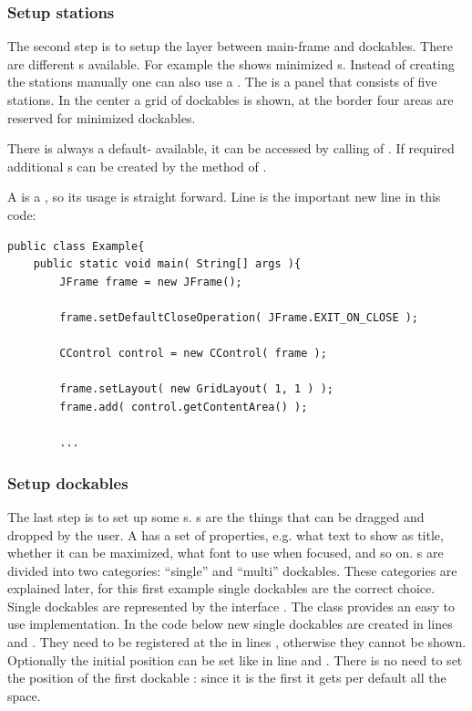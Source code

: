 \subsubsection{Setup stations}
The second step is to setup the layer between main-frame and dockables. There are different s available. For example the  shows minimized s. Instead of creating the stations manually one can also use a . The  is a panel that consists of five stations. In the center a grid of dockables is shown, at the border four areas are reserved for minimized dockables.

There is always a default- available, it can be accessed by calling  of . If required additional s can be created by the method  of .

A  is a , so its usage is straight forward. Line  is the important new line in this code:
\begin{lstlisting}
public class Example{
	public static void main( String[] args ){
		JFrame frame = new JFrame();
		
		frame.setDefaultCloseOperation( JFrame.EXIT_ON_CLOSE );
		
		CControl control = new CControl( frame );
		
		frame.setLayout( new GridLayout( 1, 1 ) );
		frame.add( control.getContentArea() );
		
		...
\end{lstlisting}


\subsubsection{Setup dockables}
The last step is to set up some s. s are the things that can be dragged and dropped by the user. A  has a set of properties, e.g. what text to show as title, whether it can be maximized, what font to use when focused, and so on.
s are divided into two categories: ``single'' and ``multi'' dockables. These categories are explained later, for this first example single dockables are the correct choice. Single dockables are represented by the interface . The class  provides an easy to use implementation.
In the code below new single dockables are created in lines  and . They need to be registered at the  in lines , otherwise they cannot be shown. Optionally the initial position can be set like in line  and . There is no need to set the position of the first dockable : since it is the first it gets per default all the space.

